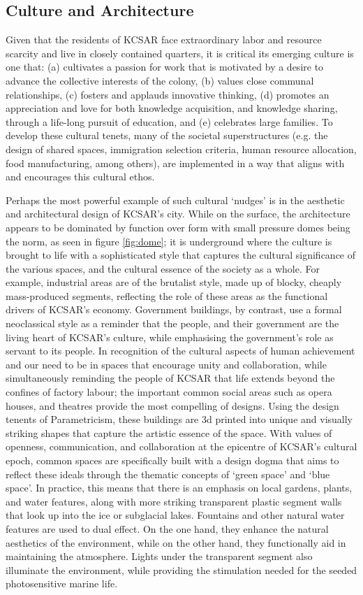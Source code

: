 \documentclass[fleqn,10pt]{Stylesheet} %
\begin{document}
\subsection{Culture and Architecture}

Given that the residents of KCSAR face extraordinary labor and resource scarcity and live in closely contained quarters, it is critical its emerging culture is one that: (a) cultivates a passion for work that is motivated by a desire to advance the collective interests of the colony, (b) values close communal relationships, (c) fosters and applauds innovative thinking, (d) promotes an appreciation and love for both knowledge acquisition, and knowledge sharing, through a life-long pursuit of education, and (e) celebrates large families. To develop these cultural tenets, many of the societal superstructures (e.g. the design of shared spaces, immigration selection criteria, human resource allocation, food manufacturing, among others), are implemented in a way that aligns with and encourages this cultural ethos.

Perhaps the most powerful example of such cultural `nudges' is in the aesthetic and architectural design of KCSAR's city. While on the surface, the architecture appears to be dominated by function over form with small pressure domes being the norm, as seen in figure \ref{fig:dome}; it is underground where the culture is brought to life with a sophisticated style that captures the cultural significance of the various spaces, and the cultural essence of the society as a whole. For example, industrial areas are of the brutalist style,  made up of blocky, cheaply mass-produced segments, reflecting the role of these areas as the functional drivers of KCSAR's economy. Government buildings, by contrast, use a formal neoclassical style as a reminder that the people, and their government are the living heart of KCSAR's culture, while emphasising the government's role as servant to its people. In recognition of the cultural aspects of human achievement and our need to be in spaces that encourage unity and collaboration, while simultaneously reminding the people of KCSAR that life extends beyond the confines of factory labour; the important common social areas such as opera houses, and theatres provide the most compelling of designs. Using the design tenents of Parametricism, these buildings are 3d printed into unique and visually striking shapes that capture the artistic essence of the space. With values of openness, communication, and collaboration at the epicentre of KCSAR’s cultural epoch, common spaces are specifically built with a design dogma that aims to reflect these ideals through the thematic concepts of `green space' and `blue space'. In practice, this means that there is an emphasis on local gardens, plants, and water features, along with more striking transparent plastic segment walls that look up into the ice or subglacial lakes. Fountains and other natural water features are used to dual effect. On the one hand, they enhance the natural aesthetics of the environment, while on the other hand, they functionally aid in maintaining the atmosphere. Lights under the transparent segment also illuminate the environment, while providing the stimulation needed for the seeded photosensitive marine life.
\end{document}

